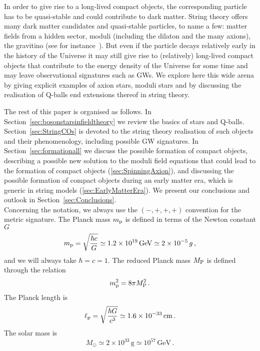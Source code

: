 \documentclass[11pt,a4paper]{article}
\begin{document}
In order to give rise to a long-lived compact objects, the corresponding particle has to be quasi-stable and could contribute to dark matter. String theory offers many dark matter candidates and quasi-stable particles, to name a few: matter fields from a hidden sector, moduli (including the dilaton and the many axions), the gravitino (see for instance~\cite{Halverson:2018xge}). But even if the particle decays relatively early in the history of the Universe it may still give rise to (relatively) long-lived compact objects that contribute to the energy density of the Universe for some time and may leave observational signatures such as GWs. We explore here this wide arena by giving explicit examples of axion stars, moduli stars and by discussing the realisation of Q-balls end extensions thereof in string theory.

The rest of this paper is organised as follows. In Section~\ref{sec:bosonstarsinfieldtheory} we review the basics of stars and Q-balls. Section~\ref{sec:StringCOs} is devoted to the string theory realisation of such objects and their phenomenology, including possible GW signatures. In Section~\ref{sec:formationall} we discuss the possible formation of compact objects, describing a possible new solution to the moduli field equations that could lead to the formation of compact objects (\ref{sec:SpinningAxion}), and discussing the possible formation of compact objects during an early matter era, which is generic in string models (\ref{sec:EarlyMatterEra}). We present our conclusions and outlook in Section~\ref{sec:Conclusions}.\\

Concerning the notation, we always use the $(-,+,+,+)$ convention for the metric signature. The Planck mass $m_{\rm p}$ is defined in terms of the Newton constant $G$
\begin{equation}
m_{\rm p} = \sqrt{\frac{\hbar c}{G}} \simeq 1.2 \times 10^{19} \, \text{GeV} \simeq 2 \times 10^{-5} \,g \,,
\end{equation}
and we will always take $\hbar = c = 1$. The reduced Planck mass $M_{\rm P}$ is defined through the relation
\begin{equation}
m_{\rm p}^2 = 8 \pi M_{\rm P}^2 \,.
\end{equation}
The Planck length is
\begin{equation}
\ell_{\rm p} = \sqrt{\frac{\hbar G}{c^3}} \simeq 1.6 \times 10^{-33} \,\text{cm} \,.
\end{equation}
The solar mass is
\begin{equation}
M_{\odot} \simeq 2 \times 10^{33} \, \text{g} \simeq 10^{57} \, \text{GeV} \,.
\end{equation}
\end{document}
